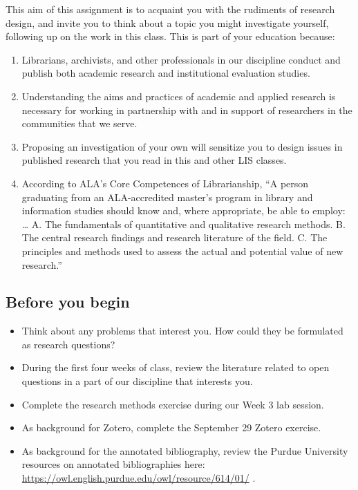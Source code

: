 \documentclass[]{article}
\providecommand{\tightlist}{%
  \setlength{\itemsep}{0pt}\setlength{\parskip}{0pt}}
\begin{document}
This aim of this assignment is to acquaint you with the rudiments of
research design, and invite you to think about a topic you might
investigate yourself, following up on the work in this class. This is
part of your education because:

\begin{enumerate}
\def\labelenumi{\arabic{enumi}.}
\item
  Librarians, archivists, and other professionals in our discipline
  conduct and publish both academic research and institutional
  evaluation studies.
\item
  Understanding the aims and practices of academic and applied research
  is necessary for working in partnership with and in support of
  researchers in the communities that we serve.
\item
  Proposing an investigation of your own will sensitize you to design
  issues in published research that you read in this and other LIS
  classes.
\item
  According to ALA's Core Competences of Librarianship, ``A person
  graduating from an ALA-accredited master's program in library and
  information studies should know and, where appropriate, be able to
  employ: \ldots{} A. The fundamentals of quantitative and qualitative
  research methods. B. The central research findings and research
  literature of the field. C. The principles and methods used to assess
  the actual and potential value of new research.''
\end{enumerate}

\subsection{Before you begin}\label{before-you-begin-1}

\begin{itemize}
\tightlist
\item
  Think about any problems that interest you. How could they be
  formulated as research questions?
\item
  During the first four weeks of class, review the literature related to
  open questions in a part of our discipline that interests you.
\item
  Complete the research methods exercise during our Week 3 lab session.
\item
  As background for Zotero, complete the September 29 Zotero exercise.
\item
  As background for the annotated bibliography, review the Purdue
  University resources on annotated bibliographies here:
  \url{https://owl.english.purdue.edu/owl/resource/614/01/} .
\end{itemize}
\end{document}
